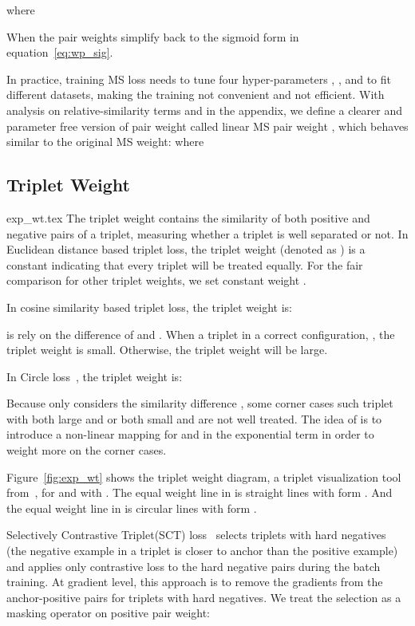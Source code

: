 \documentclass[10pt,twocolumn,letterpaper]{article}
\begin{document}
where 


When  the pair weights simplify back to the sigmoid form in equation~\ref{eq:wp_sig}. 

In practice, training MS loss needs to tune four hyper-parameters , ,  and  to fit different datasets, making the training not convenient and not efficient. With analysis on relative-similarity terms  and  in the appendix, we define a clearer and parameter free version of pair weight called linear MS pair weight , which behaves similar to the original MS weight:
where 


\subsection{Triplet Weight}
\label{sec:idea_wt}
{exp_wt.tex}
The triplet weight contains the similarity of both positive and negative pairs of a triplet, measuring whether a triplet is well separated or not. In Euclidean distance based triplet loss, the triplet weight (denoted as ) is a constant indicating that every triplet will be treated equally. For the fair comparison for other triplet weights, we set constant weight . 


In cosine similarity based triplet loss, the triplet weight is:

 is rely on the difference of  and . When a triplet in a correct configuration, , the triplet weight is small. Otherwise, the triplet weight will be large. 

In Circle loss~\cite{Sun_2020_CVPR}, the triplet weight is:

Because  only considers the similarity difference , some corner cases such triplet with both large  and  or both small  and  are not well treated.  The idea of  is to introduce a non-linear mapping for  and  in the exponential term in order to weight more on the corner cases. 

Figure~\ref{fig:exp_wt} shows the triplet weight diagram, a triplet visualization tool from~\cite{Xuan_2020_ECCV}, for  and  with . The equal weight line in  is straight lines with form . And the equal weight line in  is circular lines with form . 

Selectively Contrastive Triplet(SCT) loss~\cite{Xuan_2020_ECCV} selects triplets with hard negatives (the negative example in a triplet is closer to anchor than the positive example) and applies only contrastive loss to the hard negative pairs during the batch training. At gradient level, this approach is to remove the gradients from the anchor-positive pairs for triplets with hard negatives. We treat the selection as a masking operator on positive pair weight:
\end{document}
